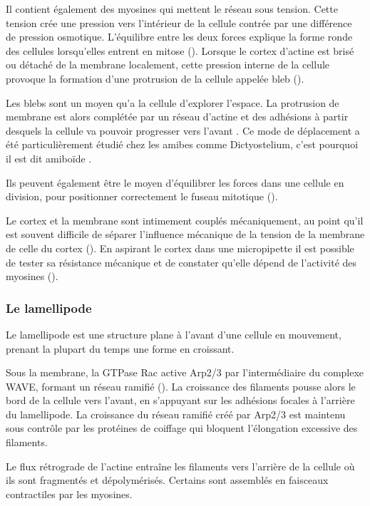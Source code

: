 \documentclass{report}
\begin{document}
Il contient également des myosines qui mettent le réseau sous tension. Cette tension crée une pression vers l'intérieur de la cellule contrée par une différence de pression osmotique. L'équilibre entre les deux forces explique la forme ronde des cellules lorsqu'elles entrent en mitose (\cite{stewart_hydrostatic_2011}).
Lorsque le cortex d'actine est brisé ou détaché de la membrane localement, cette pression interne de la cellule provoque la formation d'une protrusion de la cellule appelée bleb (\cite{paluch_cortical_2005}).

Les blebs sont un moyen qu'a la cellule d'explorer l'espace. La protrusion de membrane est alors complétée par un réseau d'actine et des adhésions à partir desquels la cellule va pouvoir progresser vers l'avant \cite{charras_blebs_2008}. 
Ce mode de déplacement a été particulièrement étudié chez les amibes comme Dictyostelium, c'est pourquoi il est dit \og amiboïde \fg.  

Ils peuvent également être le moyen d'équilibrer les forces dans une cellule en division, pour positionner correctement le fuseau mitotique (\cite{sedzinski_polar_2011}).

Le cortex et la membrane sont intimement couplés mécaniquement, au point qu'il est souvent difficile de séparer l'influence mécanique de la tension de la membrane de celle du cortex (\cite{campillo_mechanics_2012}). 
En aspirant le cortex dans une micropipette il est possible de tester sa résistance mécanique et de constater qu'elle dépend de l'activité des myosines (\cite{bergert_cell_2012}).  



\subsubsection{Le lamellipode}

Le lamellipode est une structure plane à l'avant d'une cellule en mouvement, prenant la plupart du temps une forme en croissant. 

Sous la membrane, la GTPase Rac active Arp2/3 par l'intermédiaire du complexe WAVE, formant un réseau ramifié (\cite{lebensohn_activation_2009}). 
La croissance des filaments pousse alors le bord de la cellule vers l'avant, en s'appuyant sur les adhésions focales à l'arrière du lamellipode. 
La croissance du réseau ramifié créé par Arp2/3 est maintenu sous contrôle par les protéines de coiffage qui bloquent l'élongation excessive des filaments. 

Le flux rétrograde de l'actine entraîne les filaments vers l'arrière de la cellule où ils sont fragmentés et dépolymérisés. 
Certains sont assemblés en faisceaux contractiles par les myosines. 
\end{document}
